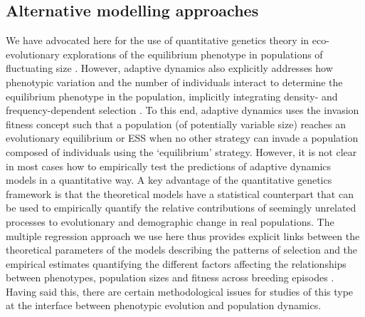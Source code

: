\documentclass{article}
\begin{document}
\subsection{Alternative modelling approaches}
We have advocated here for the use of quantitative genetics theory in eco-evolutionary explorations of the equilibrium phenotype in populations of fluctuating size \citep{Engen2013, Engen2020, Lande2009a, Lande2017}. However, adaptive dynamics also explicitly addresses how phenotypic variation and the number of individuals interact to determine the equilibrium phenotype in the population, implicitly integrating density- and frequency-dependent selection \citep{McGill2007}. To this end, adaptive dynamics uses the invasion fitness concept \citep[for its link to other fitness measures, see][]{Lehmann2016} such that a population (of potentially variable size) reaches an evolutionary equilibrium or ESS when no other strategy can invade a population composed of individuals using the `equilibrium' strategy. However, it is not clear in most cases how to empirically test the predictions of adaptive dynamics models in a quantitative way. A key advantage of the quantitative genetics framework is that the theoretical models have a statistical counterpart that can be used to empirically quantify the relative contributions of seemingly unrelated processes to evolutionary and demographic change in real populations. The multiple regression approach we use here thus provides explicit links between the theoretical parameters of the models describing the patterns of selection and the empirical estimates quantifying the different factors affecting the relationships between phenotypes, population sizes and fitness across breeding episodes \citep{Lande1983, Queller1992b, Wolf1999SocialSelection, Heisler1987, Goodnight1992}. Having said this, there are certain methodological issues for studies of this type at the interface between phenotypic evolution and population dynamics.
\end{document}
